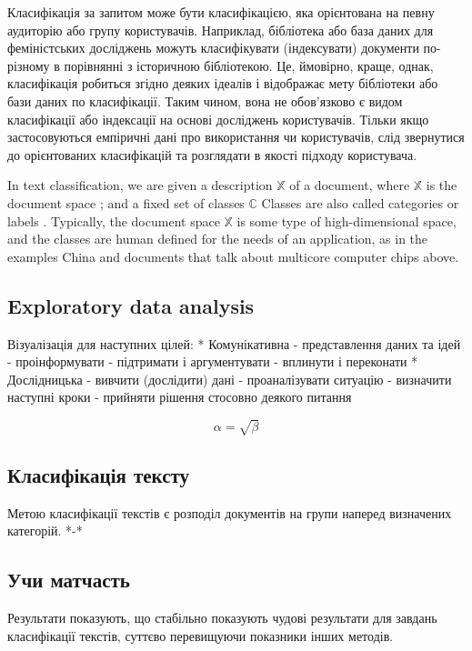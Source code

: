 Класифікація за запитом може бути класифікацією, яка орієнтована на певну аудиторію або групу користувачів. Наприклад, бібліотека або база даних для феміністських досліджень можуть класифікувати (індексувати) документи по-різному в порівнянні з історичною бібліотекою. Це, ймовірно, краще, однак, класифікація робиться згідно деяких ідеалів і відображає мету бібліотеки або бази даних по класифікації. Таким чином, вона не обов'язково є видом класифікації або індексації на основі досліджень користувачів. Тільки якщо застосовуються емпіричні дані про використання чи користувачів, слід звернутися до орієнтованих класифікацій та розглядати в якості підходу користувача.

In text classification, we are given a description
$\mathbb{X}$ of a document, where $\mathbb{X}$ is the document space ; and a fixed set
of classes  $\mathbb{C}$ Classes are also called categories or
labels . Typically, the document space  $\mathbb{X}$ is some type of high-dimensional space,
and the classes are human defined for the needs of an application, as in the examples China
and documents that talk about multicore computer chips above.

\subsection{Exploratory data analysis}
Візуалізація для наступних цілей:
* Комунікативна
- представлення даних та ідей
- проінформувати
- підтримати і аргументувати
- вплинути і переконати
* Дослідницька
- вивчити (дослідити) дані
- проаналізувати ситуацію
- визначити наступні кроки
- прийняти рішення стосовно деякого питання

\begin{equation}
    \label{simple_equation}
    \alpha = \sqrt{ \beta }
\end{equation}

\subsection{Класифікація тексту}
Метою класифікації текстів є розподіл документів на групи наперед визначених категорій. *-*


\subsection{Учи матчасть}
Результати показують, що стабільно показують чудові результати для завдань класифікації
текстів, суттєво перевищуючи показники інших методів.

